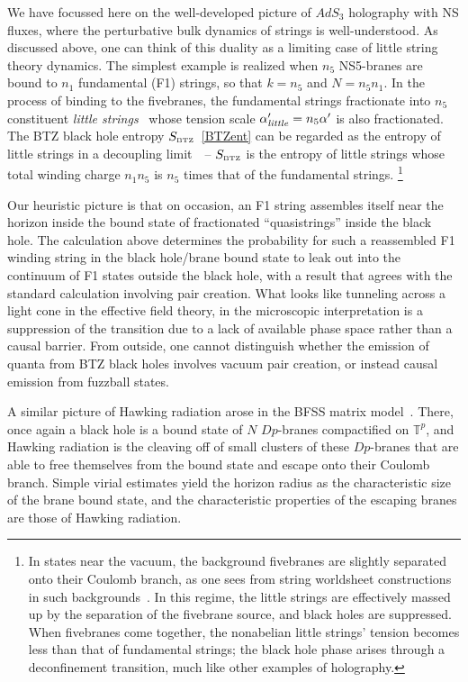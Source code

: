 \documentclass[11pt]{article}
\newcommand{\rcite}{\cite}
\def\btz{{\sst \rm BTZ}}
\newcommand{\bT}{{\mathbb T}}
\numberwithin{equation}{section}
\def\sst{\scriptscriptstyle}
\begin{document}
We have focussed here on the well-developed picture of $AdS_3$ holography with NS fluxes, where the perturbative bulk dynamics of strings is well-understood.  As discussed above, one can think of this duality as a limiting case of little string theory dynamics.
%
The simplest example is realized when $n_5$ NS5-branes are bound to $n_1$ fundamental (F1) strings, so that $k=n_5$ and $N=n_5n_1$.   In the process of binding to the fivebranes, the fundamental strings fractionate into $n_5$ constituent {\it little strings}~\rcite{Seiberg:1997zk,Dijkgraaf:1997ku,Kutasov:2001uf,Martinec:2019wzw} whose tension scale $\alpha'_{\it little}=n_5\alpha'$ is also fractionated.  
%
The BTZ black hole entropy $S_\btz$~\eqref{BTZent} can be regarded as the entropy of little strings in a decoupling limit~\rcite{Maldacena:1996ya,Martinec:2019wzw}~-- $S_\btz$ is the entropy of little strings whose total winding charge $n_1n_5$ is $n_5$ times that of the fundamental strings.%
\footnote{In states near the vacuum, the background fivebranes are slightly separated onto their Coulomb branch, as one sees from string worldsheet constructions in such backgrounds~\rcite{Martinec:2017ztd,Martinec:2018nco,Martinec:2019wzw,Martinec:2020gkv,Martinec:2022okx}.  In this regime, the little strings are effectively massed up by the separation of the fivebrane source, and black holes are suppressed.  When fivebranes come together, the nonabelian little strings' tension becomes less than that of fundamental strings; the black hole phase arises through a deconfinement transition, much like other examples of holography.}

Our heuristic picture is that on occasion, an F1 string assembles itself near the horizon inside the bound state of fractionated ``quasistrings'' inside the black hole.  The calculation above determines the probability for such a reassembled F1 winding string in the black hole/brane bound state to leak out into the continuum of F1 states outside the black hole, with a result that agrees with the standard calculation involving pair creation.  What looks like tunneling across a light cone in the effective field theory, in the microscopic interpretation is a suppression of the transition due to a lack of available phase space rather than a causal barrier.
From outside, one cannot distinguish whether the emission of quanta from BTZ black holes involves vacuum pair creation, or instead causal emission from fuzzball states.

A similar picture of Hawking radiation arose in the BFSS matrix model~\rcite{Banks:1997hz,Klebanov:1997kv,Horowitz:1997fr,Li:1998ci}.  There, once again a black hole is a bound state of $N$ $Dp$-branes compactified on $\bT^p$, and Hawking radiation is the cleaving off of small clusters of these $Dp$-branes that are able to free themselves from the bound state and escape onto their Coulomb branch.  Simple virial estimates yield the horizon radius as the characteristic size of the brane bound state, and the characteristic properties of the escaping branes are those of Hawking radiation.  
\end{document}
